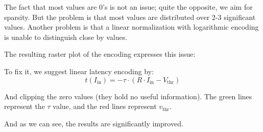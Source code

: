 The fact that most values are 0's is not an issue; quite the opposite, we aim for sparsity. But the problem is that most values are distributed over 2-3 significant values. Another problem is that a linear normalization with logarithmic encoding is unable to distinguish close by values.

The resulting raster plot of the encoding expresses this issue:

\begin{figure}[h]
    \centering
\end{figure}

To fix it, we suggest linear latency encoding by:
\begin{equation}
t(I_{\text{in}}) = -\tau \cdot \left(R \cdot I_{\text{in}} - V_{\text{thr}}\right)
\end{equation}

And clipping the zero values (they hold no useful information). The green lines represent the $\tau$ value, and the red lines represent $v_{\text{thr}}$.

And as we can see, the results are significantly improved.
